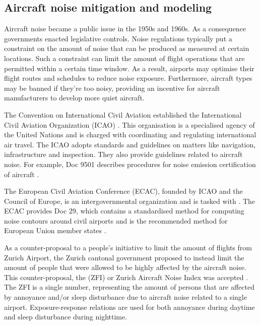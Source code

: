 \subsection{Aircraft noise mitigation and modeling}
Aircraft noise became a public issue in the 1950s and 1960s. As a consequence
governments enacted legislative controls. Noise regulations typically put a
constraint on the amount of noise that can be produced as measured at certain
locations. Such a constraint can limit the amount of flight operations that are
permitted within a certain time window. As a result, airports may optimise their
flight routes and schedules to reduce noise exposure. Furthermore, aircraft
types may be banned if they're too noisy, providing an incentive for
aircraft manufacturers to develop more quiet aircraft.


The Convention on International Civil Aviation established the International
Civil Aviation Organization (ICAO) \cite{ICAO2017}. This organisation is a
specialised agency of the United Nations and is charged with coordinating and
regulating international air travel. The ICAO adopts standards and guidelines on
matters like navigation, infrastructure and inspection. They also provide
guidelines related to aircraft noise. For example, Doc 9501 describes procedures
for noise emission certification of aircraft \cite{ICAO_9501}.


The European Civil Aviation Conference (ECAC), founded by ICAO and the Council
of Europe, is an intergovernmental organization and is tasked with  \cite{ECAC2017}. The ECAC provides Doc 29, which
contains a standardised method for computing noise contours around civil
airports \cite{Doc29_fourth_2016} and is the recommended method for European
Union member states \cite{directive_2002_49_ec}.

As a counter-proposal to a people's initiative to limit the amount of flights
from Zurich Airport, the Zurich cantonal government proposed to instead limit
the amount of people that were allowed to be highly affected by the aircraft
noise. This counter-proposal, the  (ZFI) or Zurich
Aircraft Noise Index was accepted \cite{Schaffer2012}. The ZFI is a single
number, representing the amount of persons that are affected by annoyance and/or
sleep disturbance due to aircraft noise related to a single airport.
Exposure-response relations are used for both annoyance during daytime and sleep
disturbance during nighttime.

